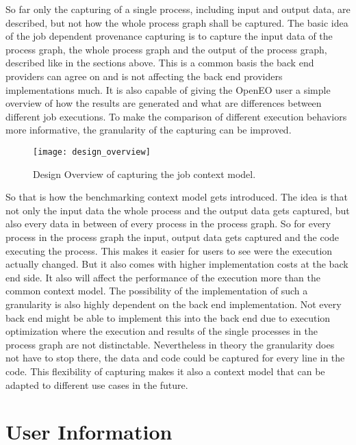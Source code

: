 \documentclass[draft,final]{vutinfth} %
\begin{document}
So far only the capturing of a single process, including input and output data, are described, but not how the whole process graph shall be captured. The basic idea of the job dependent provenance capturing is to capture the input data of the process graph, the whole process graph and the output of the process graph, described like in the sections above. This is a common basis the back end providers can agree on and is not affecting the back end providers implementations much. It is also capable of giving the OpenEO user a simple overview of how the results are generated and what are differences between different job executions. 
To make the comparison of different execution behaviors more informative, the granularity of the capturing can be improved. 
\begin{figure}[h]
	\centering
	\texttt{[image: design\_overview]}
	\caption{Design Overview of capturing the job context model.}
	\label{fig:intro} %
\end{figure}
So that is how the benchmarking context model gets introduced. The idea is that not only the input data the whole process and the output data gets captured, but also every data in between of every process in the process graph. So for every process in the process graph the input, output data gets captured and the code executing the process. This makes it easier for users to see were the execution actually changed. But it also comes with higher implementation costs at the back end side. It also will affect the performance of the execution more than the common context model. The possibility of the implementation of such a granularity is also highly dependent on the back end implementation. Not every back end might be able to implement this into the back end due to execution optimization where the execution and results of the single  processes in the process graph are not distinctable. Nevertheless in theory the granularity does not have to stop there, the data and code could be captured for every line in the code. This flexibility of capturing makes it also a context model that  can be adapted to different use cases in the future. 
\section{User Information}
\end{document}
